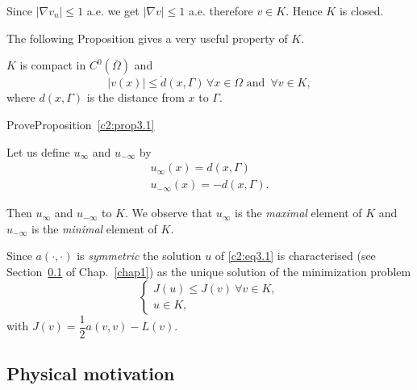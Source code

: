 Since $| \nabla v_n | \leq 1$ a.e. we get $| \nabla v |
\leq 1$ a.e. therefore $v \in K$. Hence $K$ is closed. 

The following Proposition gives a very useful property of $K$. 

\begin{proposition}\label{c2:prop3.1} %
$K$  is compact in $C^0 (\bar{\Omega})$ and 
\begin{equation}
| v (x) | \leq \dot{d} (x, \Gamma)\, \forall  x \in \Omega \text
{ and }\, \forall  v \in K,\tag{3.3}\label{c2:eq3.3} 
\end{equation}
where $d (x, \Gamma)$ is the distance from $x$ to $\Gamma$.
\end{proposition}

\begin{exercise}\label{c2:exer3.1}%
Prove\pageoriginale  Proposition~\ref{c2:prop3.1}
\end{exercise}

\begin{remark}\label{c2:rem3.1}%
Let us define $u_\infty$ and $u_{-\infty}$ by 
\begin{gather*}
u_\infty (x) = d(x, \Gamma)\\
u_{-\infty} (x) = -d(x, \Gamma).
\end{gather*}
\end{remark}

Then $u_{\infty}$ and $u_{-\infty}$ to $K$. We observe that $u_\infty$
is the \textit{maximal} element of $K$ and $u_{-\infty}$ is the
\textit{minimal} element of $K$. 

\begin{remark}\label{c2:rem3.2}%
Since $a(\cdot , \cdot)$ is {\em symmetric} the solution $u$ of \eqref{c2:eq3.1} is
characterised (see Section~\ref{c2:ss3.2} of Chap.~\ref{chap1}) as the unique solution of
the minimization problem 
\begin{equation}
\begin{cases}
J(u) \leq J(v) ~\forall v \in K,\\
u \in K, 
\end{cases}\tag{3.4}\label{c2:eq3.4}
\end{equation}
with $J(v) = \dfrac{1}{2} a(v, v) - L (v)$.
\end{remark}

\subsection{Physical motivation}\label{c2:ss3.2}%

